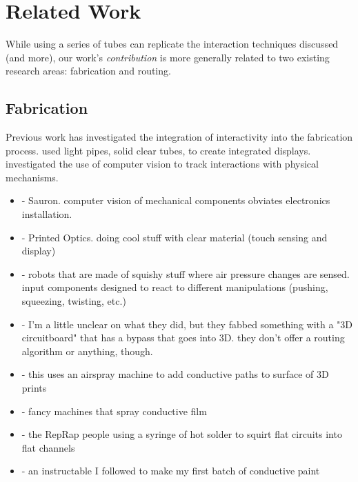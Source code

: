 \section{Related Work}

While using a series of tubes can replicate the interaction techniques discussed (and more), our work's \emph{contribution} is more generally related to two existing research areas: fabrication and routing.

\subsection{Fabrication}

Previous work has investigated the integration of interactivity into the fabrication process.  \cite{Willis-printedoptics} used light pipes, solid clear tubes, to create integrated displays.  \cite{Savage-sauron} investigated the use of computer vision to track interactions with physical mechanisms.
\begin{itemize}
\item \cite{Savage-sauron} - Sauron.  computer vision of mechanical components obviates electronics installation.
\item \cite{Willis-printedoptics} - Printed Optics.  doing cool stuff with clear material (touch sensing and display)
\item \cite{Slyper-pressure} - robots that are made of squishy stuff where air pressure changes are sensed.  input components designed to react to different manipulations (pushing, squeezing, twisting, etc.)
\item \cite{Navarrette-gps} - I'm a little unclear on what they did, but they fabbed something with a "3D circuitboard" that has a bypass that goes into 3D.  they don't offer a routing algorithm or anything, though.
\item \cite{Sarik-tracebrush} - this uses an airspray machine to add conductive paths to surface of 3D prints
\item \cite{Optomec} - fancy machines that spray conductive film
\item \cite{Sells-reprap} - the RepRap people using a syringe of hot solder to squirt flat circuits into flat channels
\item \cite{icecats-conductivepaint} - an instructable I followed to make my first batch of conductive paint
\end{itemize}

